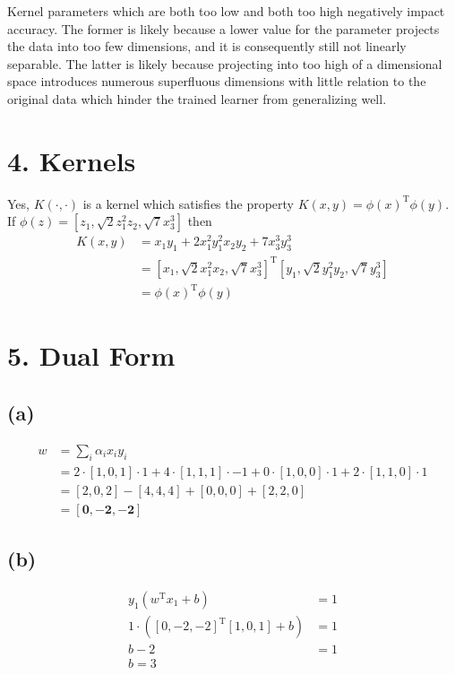 \documentclass[12pt]{article}
\begin{document}
	 Kernel parameters which are both too low and both too high negatively impact accuracy. The former is likely because a lower value for the parameter projects the data into too few dimensions, and it is consequently still not linearly separable. The latter is likely because projecting into too high of a dimensional space introduces numerous superfluous dimensions with little relation  to the original data which hinder the trained learner from generalizing well.

	\section*{4. Kernels}
	Yes, $K\left(\cdot,\cdot\right)$ is a kernel which satisfies the property $K\left(x,y\right)=\phi\left(x\right)^\textrm{T}\phi\left(y\right)$. If $\phi\left(z\right)=\left[z_1,\sqrt{2}z_1^2z_2,\sqrt{7}x_3^3\right]$ then
	\begin{align}
		K\left(x,y\right) &= x_1 y_1 + 2x_1^2 y_1^2 x_2 y_2 + 7x_3^3 y_3^3 \\
		&= \left[x_1, \sqrt{2}x_1^2x_2, \sqrt{7}x_3^3\right]^\textrm{T}\left[y_1, \sqrt{2}y_1^2y_2, \sqrt{7}y_3^3\right] \\
		&= \phi\left(x\right)^\textrm{T}\phi\left(y\right)
	\end{align}

	\section*{5. Dual Form}
	\subsection*{(a)}
	\begin{align}
		w &= \sum_i\alpha_ix_iy_i \\
		&= 2 \cdot \left[1,0,1\right] \cdot 1 + 4 \cdot \left[1,1,1\right] \cdot -1 + 0 \cdot \left[1,0,0\right] \cdot 1 + 2 \cdot \left[1,1,0\right] \cdot 1 \\
		&= \left[2,0,2\right] - \left[4,4,4\right] + \left[0,0,0\right] + \left[2,2,0\right] \\
		&=\mathbf{\left[0,-2,-2\right]}
	\end{align}
	
	\subsection*{(b)}	
	\begin{align}
		y_1\left(w^\textrm{T}x_1+b\right) &= 1 \\
		1 \cdot \left(\left[0,-2,-2\right]^\textrm{T}\left[1,0,1\right] + b\right) &= 1 \\
		b - 2 &= 1 \\
		b = 3
	\end{align}
\end{document}
